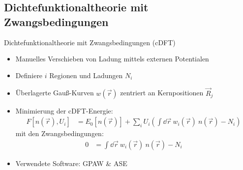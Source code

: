 \subsection{Dichtefunktionaltheorie mit Zwangsbedingungen}
\begin{frame}{Dichtefunktionaltheorie mit Zwangsbedingungen (cDFT)}
\hspace*{-.5cm}
\begin{minipage}{0.75\textwidth}
	\vspace*{-1.5cm}
	\begin{itemize}
		\item Manuelles Verschieben von Ladung mittels externen Potentialen
		\item Definiere $i$ Regionen und Ladungen $N_i$
		\item Überlagerte Gauß-Kurven $w(\vec{r})$ zentriert an Kernpositionen $\vec{R}_j$
	\end{itemize}
\end{minipage}
\begin{minipage}{0.25\textwidth}
	\vspace*{-.8cm}
\end{minipage}
\hspace*{-.5cm}
\begin{minipage}{\textwidth}
\vspace*{-1cm}
\begin{itemize}
	\item Minimierung der cDFT-Energie:
	\begin{align*}
	F\left[n\left(\vec{r}\right), U_i\right] &= E_0\left[n\left(\vec{r}\right)\right] + 
	\sum_i U_i\left(\int\dd\vec{r}\ w_i\left(\vec{r}\right)\ n\left(\vec{r}\right) - N_i\right)
	\end{align*}
	mit den Zwangsbedingungen:
	\begin{align*}
	0 &= \int\dd\vec{r}\ w_i\left(\vec{r}\right)\ n\left(\vec{r}\right) - N_i
	\end{align*}
	\item Verwendete Software: GPAW \& ASE
\end{itemize}
\end{minipage}
\end{frame}

